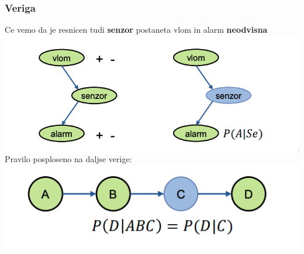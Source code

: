 \subsubsection{Veriga}
Ce vemo da je resnicen tudi \textbf{senzor} postaneta vlom in alarm \textbf{neodvisna}\\
\includegraphics[width=\columnwidth]{images/bayes-veriga.png}\\
Pravilo posploseno na daljse verige:\\
\includegraphics[width=\columnwidth]{images/bayes-veriga2.png}

